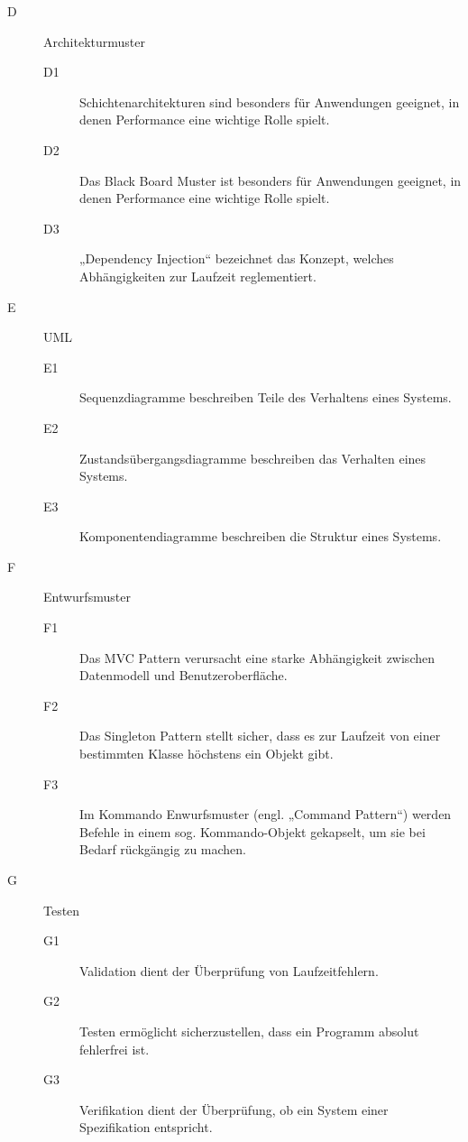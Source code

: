 \documentclass{lehramt-informatik-minimal}
\begin{document}
\begin{description}
%

\item[D] Architekturmuster

\begin{description}
\item[D1] Schichtenarchitekturen sind besonders für Anwendungen
geeignet, in denen Performance eine wichtige Rolle spielt.

\item[D2] Das Black Board Muster ist besonders für Anwendungen geeignet,
in denen Performance eine wichtige Rolle spielt.

\item[D3] „Dependency Injection“ bezeichnet das Konzept, welches
Abhängigkeiten zur Laufzeit reglementiert.
\end{description}

%

\item[E] UML

\begin{description}
\item[E1] Sequenzdiagramme beschreiben Teile des Verhaltens eines
Systems.

\item[E2] Zustandsübergangsdiagramme beschreiben das Verhalten eines
Systems.

\item[E3] Komponentendiagramme beschreiben die Struktur eines Systems.
\end{description}

%

\item[F] Entwurfsmuster

\begin{description}
\item[F1] Das MVC Pattern verursacht eine starke Abhängigkeit zwischen
Datenmodell und Benutzeroberfläche.

\item[F2] Das Singleton Pattern stellt sicher, dass es zur Laufzeit von
einer bestimmten Klasse höchstens ein Objekt gibt.

\item[F3] Im Kommando Enwurfsmuster (engl. „Command Pattern“) werden
Befehle in einem sog. Kommando-Objekt gekapselt, um sie bei Bedarf
rückgängig zu machen.
\end{description}

%

\item[G] Testen

\begin{description}
\item[G1] Validation dient der Überprüfung von Laufzeitfehlern.

\item[G2] Testen ermöglicht sicherzustellen, dass ein Programm absolut
fehlerfrei ist.

\item[G3] Verifikation dient der Überprüfung, ob ein System einer
Spezifikation entspricht.
\end{description}

\end{description}
\end{document}
